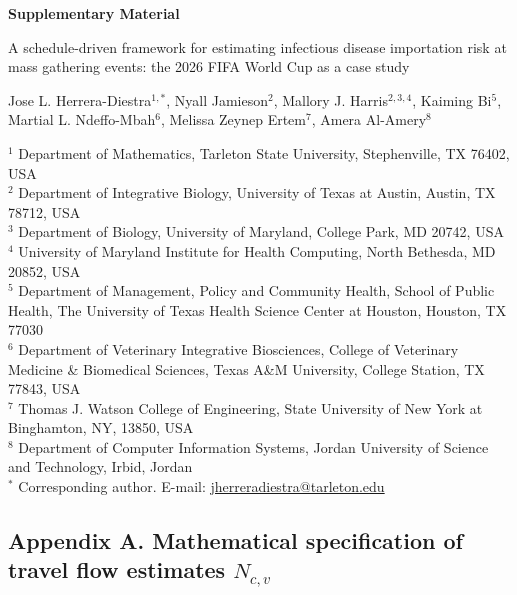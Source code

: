 \documentclass[12pt, a4paper]{article}
\newcounter{suppfig}
\begin{document}
\begin{center}
{\Large\bfseries Supplementary Material}

\vspace{0.5cm}

{\large A schedule-driven framework for estimating infectious
disease importation risk at mass gathering events: the 2026 FIFA
World Cup as a case study}

\vspace{0.5cm}

Jose L. Herrera-Diestra$^{1,*}$, Nyall Jamieson$^{2}$, Mallory J. Harris$^{2,3,4}$, Kaiming Bi$^{5}$, Martial L. Ndeffo-Mbah$^{6}$,  Melissa Zeynep Ertem$^{7}$, Amera Al-Amery$^{8}$

\vspace{0.3cm}

{\small
$^{1}$ Department of Mathematics, Tarleton State University, Stephenville, TX 76402, USA\\
$^{2}$ Department of Integrative Biology, University of Texas at Austin, Austin, TX 78712, USA\\
$^{3}$ Department of Biology, University of Maryland, College Park, MD 20742, USA\\
$^{4}$ University of Maryland Institute for Health Computing, North Bethesda, MD 20852, USA\\
$^{5}$ Department of Management, Policy and Community Health, School of Public Health, The University of Texas Health Science Center at Houston, Houston, TX 77030\\
$^{6}$ Department of Veterinary Integrative Biosciences, College of Veterinary Medicine \& Biomedical Sciences, Texas A\&M University, College Station, TX 77843, USA\\
$^{7}$ Thomas J. Watson College of Engineering, State University of New York at Binghamton, NY, 13850, USA\\
$^{8}$ Department of Computer Information Systems, Jordan University of Science and Technology, Irbid, Jordan\\
$^{*}$ Corresponding author.
E-mail: \href{mailto:jherreradiestra@tarleton.edu}{jherreradiestra@tarleton.edu}
}
\end{center}

\vspace{0.5cm}

\setcounter{suppfig}{0}

\subsection*{Appendix A. Mathematical specification of travel flow
estimates $N_{c,v}$}
\end{document}
